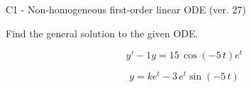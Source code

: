 \begin{exercise}
  \begin{exerciseTitle}C1 - Non-homogeneous first-order linear ODE (ver. 27)\end{exerciseTitle}
  \begin{exerciseStatement}
    
Find the general solution to the given ODE.

    
\[y'-1y= 15 \, \cos\left(-5 \, t\right) e^{t}\]

  \end{exerciseStatement}
  \begin{exerciseAnswer}
    
\[y= k e^{t} - 3 \, e^{t} \sin\left(-5 \, t\right)\]

  \end{exerciseAnswer}
\end{exercise}